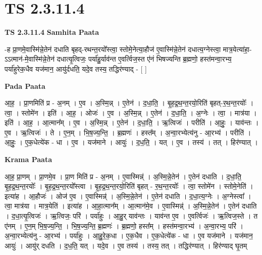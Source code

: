 \documentclass[17pt]{extarticle}
\begin{document}
\section{ TS 2.3.11.4 }

\textbf{TS 2.3.11.4 } \newline
\textbf{Samhita Paata} \newline

-ह प्रा॒णमे॒वास्मि॑न्ने॒तेन॑ दधाति बृहद्-रथन्त॒रयो᳚स्त्वा॒ स्तोमे॒नेत्या॒हौज॑ ए॒वास्मि॑न्ने॒तेन॑ दधात्य॒ग्नेस्त्वा॒ मात्र॒येत्या॑हा॒-ऽऽत्मान॑-मे॒वास्मि॑न्ने॒तेन॑ दधात्यृ॒त्विजः॒ पर्या॑हु॒र्याव॑न्त ए॒वर्त्विज॒स्त ए॑नं भिषज्यन्ति ब्र॒ह्मणो॒ हस्त॑मन्वा॒रभ्य॒ पर्या॑हुरेक॒धैव यज॑मान॒ आयु॑र्दधति॒ यदे॒व तस्य॒ तद्धिर॑ण्याद् - [  ] \newline

\textbf{Pada Paata} \newline

आ॒ह॒ । प्रा॒णमिति॑ प्र - अ॒नम् । ए॒व । अ॒स्मि॒न्न् । ए॒तेन॑ । द॒धा॒ति॒ । बृ॒ह॒द्र॒थ॒न्त॒रयो॒रिति॑ बृहत्-र॒थ॒न्त॒रयोः᳚ । त्वा॒ । स्तोमे॑न । इति॑ । आ॒ह॒ । ओजः॑ । ए॒व । अ॒स्मि॒न्न् । ए॒तेन॑ । द॒धा॒ति॒ । अ॒ग्नेः । त्वा॒ । मात्र॑या । इति॑ । आ॒ह॒ । आ॒त्मान᳚म् । ए॒व । अ॒स्मि॒न्न् । ए॒तेन॑ । द॒धा॒ति॒ । ऋ॒त्विजः॑ । परीति॑ । आ॒हुः॒ । याव॑न्तः । ए॒व । ऋ॒त्विजः॑ । ते । ए॒न॒म् । भि॒ष॒ज्य॒न्ति॒ । ब्र॒ह्मणः॑ । हस्त᳚म् । अ॒न्वा॒रभ्येत्य॑नु - आ॒रभ्य॑ । परीति॑ । आ॒हुः॒ । ए॒क॒धेत्ये॑क - धा । ए॒व । यज॑माने । आयुः॑ । द॒ध॒ति॒ । यत् । ए॒व । तस्य॑ । तत् । हिर॑ण्यात् ।  \newline


\textbf{Krama Paata} \newline

आ॒ह॒ प्रा॒णम् । प्रा॒णमे॒व । प्रा॒ण मिति॑ प्र - अ॒नम् । ए॒वास्मिन्न्॑ । अ॒स्मि॒न्ने॒तेन॑ । ए॒तेन॑ दधाति । द॒धा॒ति॒ बृ॒ह॒द्र॒थ॒न्त॒रयोः᳚ । बृ॒ह॒द्र॒थ॒न्त॒रयो᳚स्त्वा । बृ॒ह॒द्र॒थ॒न्त॒रयो॒रिति॑ बृहत् - र॒थ॒न्त॒रयोः᳚ । त्वा॒ स्तोमे॑न । स्तोमे॒नेति॑ । इत्या॑ह । आ॒हौजः॑ । ओज॑ ए॒व । ए॒वास्मिन्न्॑ । अ॒स्मि॒न्ने॒तेन॑ । ए॒तेन॑ दधाति । द॒धा॒त्य॒ग्नेः । अ॒ग्नेस्त्वा᳚ । त्वा॒ मात्र॑या । मात्र॒येति॑ । इत्या॑ह । आ॒हा॒त्मान᳚म् । आ॒त्मान॑मे॒व । ए॒वास्मिन्न्॑ । अ॒स्मि॒न्ने॒तेन॑ । ए॒तेन॑ दधाति । द॒धा॒त्यृ॒त्विजः॑ । ऋ॒त्विजः॒ परि॑ । पर्या॑हुः । आ॒हु॒र् याव॑न्तः । याव॑न्त ए॒व । ए॒वर्त्विजः॑ । ऋ॒त्विज॒स्ते । त ए॑नम् । ए॒न॒म् भि॒ष॒ज्य॒न्ति॒ । भि॒ष॒ज्य॒न्ति॒ ब्र॒ह्मणः॑ । ब्र॒ह्मणो॒ हस्त᳚म् । हस्त॑मन्वा॒रभ्य॑ । अ॒न्वा॒रभ्य॒ परि॑ । अ॒न्वा॒रभ्येत्य॑नु - आ॒रभ्य॑ । पर्या॑हुः । आ॒हु॒रे॒क॒धा । ए॒क॒धैव । ए॒क॒धेत्ये॑क - धा । ए॒व यज॑माने । यज॑मान॒ आयुः॑ । आयु॑र् दधति । द॒ध॒ति॒ यत् । यदे॒व । ए॒व तस्य॑ । तस्य॒ तत् । तद्धिर॑ण्यात् । हिर॑ण्याद् घृ॒तम् \newline
\end{document}

